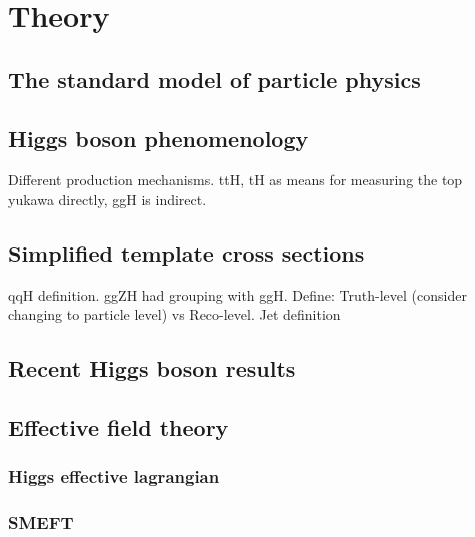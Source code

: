 \chapter{Theory}
\label{chap:theory}

\section{The standard model of particle physics}

\section{Higgs boson phenomenology}
Different production mechanisms. ttH, tH as means for measuring the top yukawa directly, ggH is indirect.

\section{Simplified template cross sections}\label{sec:theory_stxs}
qqH definition. ggZH had grouping with ggH. Define: Truth-level (consider changing to particle level) vs Reco-level. Jet definition

\section{Recent Higgs boson results}

\section{Effective field theory}
\subsection{Higgs effective lagrangian}

\subsection{SMEFT}